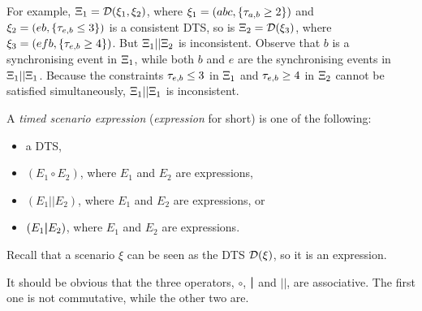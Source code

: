 For example, $\Xi_1 = \mathcal{D}(\xi_1,\xi_2)$, where
 $\xi_1 = (abc, \{\tau_{a,b} \geq 2\})$ and $\xi_2 =
 (eb, \{\tau_{e,b} \leq 3\})$ is a consistent DTS, so is
$\Xi_2 = \mathcal{D}(\xi_3)$, where
 $\xi_3 = (efb, \{\tau_{e,b} \geq 4\})$. But
$\Xi_1||\Xi_2$ is inconsistent. Observe that $b$ is a
synchronising event in $\Xi_1$, while both $b$ and $e$ are the
synchronising events in $\Xi_1||\Xi_1$. Because the
constraints $\tau_{e,b} \leq 3$ in $\Xi_1$ and $\tau_{e,b}
\geq 4$ in $\Xi_2$ cannot be satisfied simultaneously,
$\Xi_1||\Xi_1$ is inconsistent.
\begin{definition}
  \label{def-simple-exp}
  A \emph{timed scenario expression} (\emph{expression}
  for short) is one of the following:
\begin{itemize}[noitemsep]
  \item
    a DTS,
  \item
    $(E_1\circ E_2)$, where $E_1$ and $E_2$ are
    expressions,
  \item
    $(E_1||E_2)$, where $E_1$ and $E_2$ are
    expressions, or
    \item
      $(E_1\boldsymbol{|} E_2)$, where $E_1$ and $E_2$ are  expressions.
  \end{itemize}
  \end{definition}
\noindent
Recall that a scenario $\xi$ can be seen as the DTS
$\mathcal{D}(\xi)$, so it is an expression.

It should be obvious that the three operators, $\circ$, $\boldsymbol{|}$ and $||$,
are associative. The first one is not commutative, while the other two
are.

